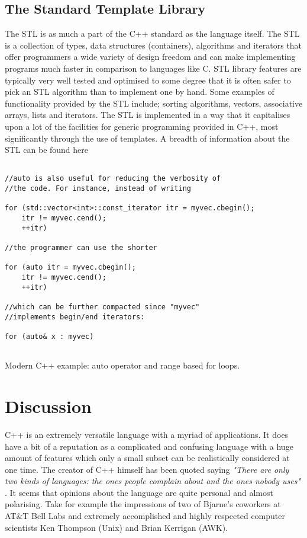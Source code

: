 \documentclass[conference, a4paper]{IEEEtran}
\begin{document}
\subsection{The Standard Template Library}
The STL is as much a part of the C++ standard as the language itself. The STL is a collection of types, data structures (containers), algorithms and iterators that offer programmers a wide variety of design freedom and can make implementing programs much faster in comparison to languages like C. STL library features are typically very well tested and optimised to some degree that it is often safer to pick an STL algorithm than to implement one by hand. Some examples of functionality provided by the STL include; sorting algorithms, vectors, associative arrays, lists and iterators. The STL is implemented in a way that it capitalises upon a lot of the facilities for generic programming provided in C++, most significantly through the use of templates. A breadth of information about the STL can be found here \cite{josuttis2012c++}

\begin{listing}[h]
\begin{verbatim}

//auto is also useful for reducing the verbosity of
//the code. For instance, instead of writing

for (std::vector<int>::const_iterator itr = myvec.cbegin();
    itr != myvec.cend();
    ++itr)

//the programmer can use the shorter

for (auto itr = myvec.cbegin();
    itr != myvec.cend();
    ++itr)

//which can be further compacted since "myvec"
//implements begin/end iterators:

for (auto& x : myvec)
        
    \end{verbatim}

    \caption{Modern C++ example: auto operator and range based for loops. \cite{C++11_2021} }
\label{listing:3}
\end{listing}


\section{Discussion}

C++ is an extremely versatile language with a myriad of applications. It does have a bit of a reputation as a complicated and confusing language with a huge amount of features which only a small subset can be realistically considered at one time. The creator of C++ himself has been quoted saying \textit{"There are only two kinds of languages: the ones people complain about and the ones nobody uses"} \cite{cppquotes}. It seems that opinions about the language are quite personal and almost polarising. Take for example the impressions of two of Bjarne's coworkers at AT\&T Bell Labs and extremely accomplished and highly respected computer scientists Ken Thompson (Unix) and Brian Kerrigan (AWK). 
\end{document}
